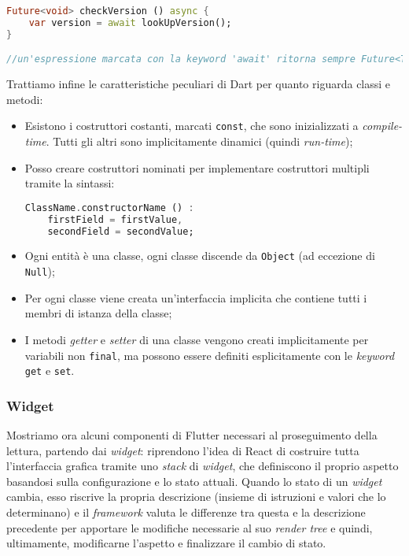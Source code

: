 \begin{lstlisting}[language=dart, firstnumber=1,caption={Dart programmazione asincrona}]
Future<void> checkVersion () async {
    var version = await lookUpVersion();
}

//un'espressione marcata con la keyword 'await' ritorna sempre Future<T>
\end{lstlisting}

Trattiamo infine le caratteristiche peculiari di Dart per quanto riguarda classi e metodi:

\begin{itemize}
    \item Esistono i costruttori costanti, marcati \verb+const+, che sono inizializzati a \textit{compile-time}. Tutti gli altri sono implicitamente dinamici (quindi \textit{run-time});
    \item Posso creare costruttori nominati per implementare costruttori multipli tramite la sintassi:
\begin{lstlisting}[language=dart]
ClassName.constructorName () :
    firstField = firstValue,
    secondField = secondValue;
\end{lstlisting}
    \item Ogni entità è una classe, ogni classe discende da \verb+Object+ (ad eccezione di \verb+Null+);
    \item Per ogni classe viene creata un'interfaccia implicita che contiene tutti i membri di istanza della classe;
    \item I metodi \textit{getter} e \textit{setter} di una classe vengono creati implicitamente per variabili non \verb+final+, ma possono essere definiti esplicitamente con le \textit{keyword} \verb+get+ e \verb+set+.
\end{itemize}

\subsubsection{Widget}
Mostriamo ora alcuni componenti di Flutter necessari al proseguimento della lettura, partendo dai \textit{widget}: riprendono l'idea di React di costruire tutta l'interfaccia grafica tramite uno \textit{stack} di \textit{widget}, che definiscono il proprio aspetto basandosi sulla configurazione e lo stato attuali. Quando lo stato di un \textit{widget} cambia, esso riscrive la propria descrizione (insieme di istruzioni e valori che lo determinano) e il \textit{framework} valuta le differenze tra questa e la descrizione precedente per apportare le modifiche necessarie al suo \textit{render tree} e quindi, ultimamente, modificarne l'aspetto e finalizzare il cambio di stato.

